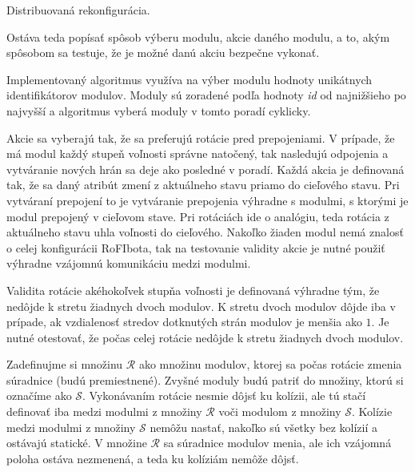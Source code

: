 \documentclass[
  digital, %
  oneside, %
  table,   %
  lof,     %
  nolot,     %
]{fithesis3}
\begin{document}
\begin{algorithm}
    \caption{Distribuovaná rekonfigurácia. }
    \label{algorithm:algo2}
    
    \DontPrintSemicolon
    
\end{algorithm}

Ostáva teda popísať spôsob výberu modulu, akcie daného modulu, a to, akým spôsobom sa testuje, že je možné danú akciu bezpečne vykonať. 

Implementovaný algoritmus využíva na výber modulu hodnoty unikátnych identifikátorov modulov. Moduly sú zoradené podľa hodnoty \textit{id} od najnižšieho po najvyšší a algoritmus vyberá moduly v tomto poradí cyklicky. 

Akcie sa vyberajú tak, že sa preferujú rotácie pred prepojeniami. V prípade, že má modul každý stupeň voľnosti správne natočený, tak nasledujú odpojenia a vytváranie nových hrán sa deje ako posledné v poradí. Každá akcia je definovaná tak, že sa daný atribút zmení z aktuálneho stavu priamo do cieľového stavu. Pri vytváraní prepojení to je vytváranie prepojenia výhradne s modulmi, s ktorými je modul prepojený v cieľovom stave. Pri rotáciách ide o analógiu, teda rotácia z aktuálneho stavu uhla voľnosti do cieľového. Nakoľko žiaden modul nemá znalosť o celej konfigurácii RoFIbota, tak na testovanie validity akcie je nutné použiť výhradne vzájomnú komunikáciu medzi modulmi. 

Validita rotácie akéhokoľvek stupňa voľnosti je definovaná výhradne tým, že nedôjde k stretu žiadnych dvoch modulov. K stretu dvoch modulov dôjde iba v prípade, ak vzdialenosť stredov dotknutých strán modulov je menšia ako $1$. Je nutné otestovať, že počas celej rotácie nedôjde k stretu žiadnych dvoch modulov. 

Zadefinujme si množinu $\mathcal{R}$ ako množinu modulov, ktorej sa počas rotácie zmenia súradnice (budú premiestnené). Zvyšné moduly budú patriť do množiny, ktorú si označíme ako $\mathcal{S}$. Vykonávaním rotácie nesmie dôjsť ku kolízii, ale tú stačí definovať iba medzi modulmi z množiny $\mathcal{R}$ voči modulom z množiny $\mathcal{S}$. Kolízie medzi modulmi z množiny $\mathcal{S}$ nemôžu nastať, nakoľko sú všetky bez kolízií a ostávajú statické. V množine $\mathcal{R}$ sa súradnice modulov menia, ale ich vzájomná poloha ostáva nezmenená, a teda ku kolíziám nemôže dôjsť. 
\end{document}
